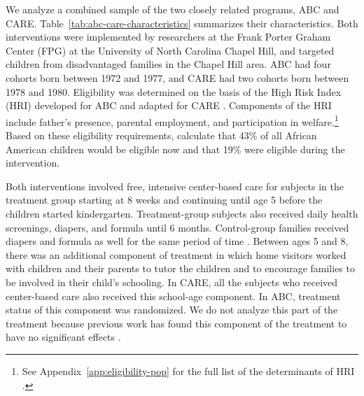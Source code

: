 We analyze a combined sample of the two closely related programs, ABC and CARE. Table~\ref{tab:abc-care-characteristics} summarizes their characteristics. Both interventions were implemented by researchers at the Frank Porter Graham Center (FPG) at the University of North Carolina Chapel Hill, and targeted children from disadvantaged families in the Chapel Hill area. ABC had four cohorts born between 1972 and 1977, and CARE had two cohorts born between 1978 and 1980. Eligibility was determined on the basis of the High Risk Index (HRI) developed for ABC and adapted for CARE \citep{amey_Smith_1977_AJMD,Wasik_Ramey_etal_1990_CD}. Components of the HRI include father's presence, parental employment, and participation in welfare.\footnote{See Appendix~\ref{app:eligibility-pop} for the full list of the determinants of HRI \citep{Ramey_Smith_1977_AJMD, Wasik_Ramey_etal_1990_CD, Ramey_Campbell_1991_childreninpoverty}.} Based on these eligibility requirements, \citet{Garcia_Heckman_Leaf_etal_2017_Comp_CBA_Unpublished} calculate that 43\% of all African American children would be eligible now and that 19\% were eligible during the intervention.

Both interventions involved free, intensive center-based care for subjects in the treatment group starting at 8 weeks and continuing until age 5 before the children started kindergarten. Treatment-group subjects also received daily health screenings, diapers, and formula until 6 months. Control-group families received diapers and formula as well for the same period of time \citep{Wasik_Ramey_etal_1990_CD,Ramey_Campbell_1991_childreninpoverty}. Between ages 5 and 8, there was an additional component of treatment in which home visitors worked with children and their parents to tutor the children and to encourage families to be involved in their child's schooling. In CARE, all the subjects who received center-based care also received this school-age component. In ABC, treatment status of this component was randomized. We do not analyze this part of the treatment because previous work has found this component of the treatment to have no significant effects \citep{Campbell_Ramey_etal_2002_ADS,Campbell_Conti_etal_2014_EarlyChildhoodInvestments}.

